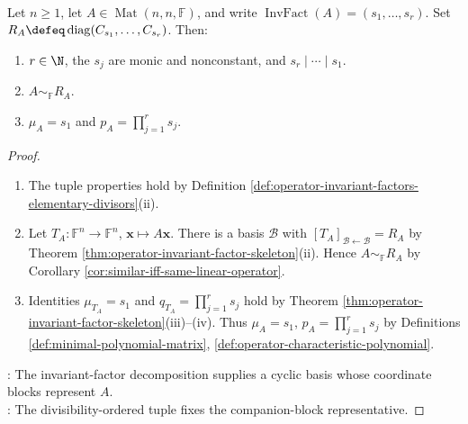 \begin{theorem} \label{thm:rational-canonical-form-skeleton} \\
Let $n\geq1$, let $A\in\operatorname{Mat}(n,n,\mathbb{F})$, and write $\operatorname{InvFact}(A)=(s_1,\ldots,s_r)$. Set $R_A\defeq\operatorname{diag}(C_{s_1},\ldots,C_{s_r})$. Then:
\begin{enumerate}[label=(\roman*)]
\setlength{\itemsep}{0pt}
\item $r\in\N$, the $s_j$ are monic and nonconstant, and $s_r\mid\cdots\mid s_1$.
\item $A\sim_{\mathbb{F}}R_A$.
\item $\mu_A=s_1$ and $p_A=\prod\limits_{j=1}^rs_j$.
\end{enumerate}
\begin{proof}
\begin{enumerate}[label=(\roman*)]
\setlength{\itemsep}{0pt}
\item The tuple properties hold by Definition \ref{def:operator-invariant-factors-elementary-divisors}(ii).
\item Let $T_A:\mathbb{F}^n\to\mathbb{F}^n$, $\mathbf{x}\mapsto A\mathbf{x}$. There is a basis $\mathcal{B}$ with $[T_A]_{\mathcal{B}\leftarrow\mathcal{B}}=R_A$ by Theorem \ref{thm:operator-invariant-factor-skeleton}(ii). Hence $A\sim_{\mathbb{F}}R_A$ by Corollary \ref{cor:similar-iff-same-linear-operator}.
\item Identities $\mu_{T_A}=s_1$ and $q_{T_A}=\prod\limits_{j=1}^rs_j$ hold by Theorem \ref{thm:operator-invariant-factor-skeleton}(iii)--(iv). Thus $\mu_A=s_1$, $p_A=\prod\limits_{j=1}^rs_j$ by Definitions \ref{def:minimal-polynomial-matrix}, \ref{def:operator-characteristic-polynomial}.
\end{enumerate}
: The invariant-factor decomposition supplies a cyclic basis whose coordinate blocks represent $A$.\\
: The divisibility-ordered tuple fixes the companion-block representative.
\end{proof}
\end{theorem}

